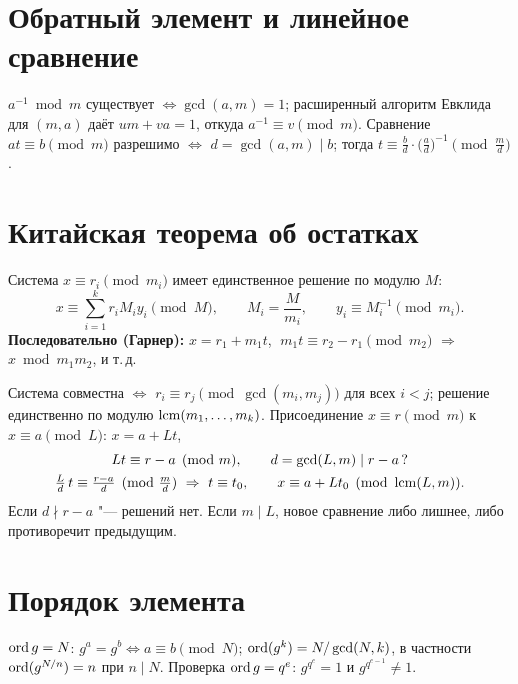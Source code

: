 \documentclass{ca-handout}
\begin{document}
\makehandouttitle

\section{Обратный элемент и линейное сравнение}
$a^{-1} \bmod m$ существует $\iff \gcd(a, m) = 1$; расширенный алгоритм Евклида для $(m, a)$
даёт $um + va = 1$, откуда $a^{-1} \equiv v \pmod m$.
Сравнение $at \equiv b \pmod m$ разрешимо $\iff$ $d = \gcd(a, m) \mid b$; тогда
$t \equiv \frac bd \cdot \bigl(\frac ad\bigr)^{-1} \pmod{\frac md}$.

\section{Китайская теорема об остатках}
\begin{reminder}[title={Попарно взаимно простые модули $m_1, \dots, m_k$, $M = m_1 \cdots m_k$}]
Система $x \equiv r_i \pmod{m_i}$ имеет единственное решение по модулю $M$:
\[
  x \equiv \sum_{i=1}^k r_i M_i y_i \pmod M, \qquad M_i = \frac{M}{m_i}, \qquad
  y_i \equiv M_i^{-1} \pmod{m_i}.
\]
\textbf{Последовательно (Гарнер):} $x = r_1 + m_1 t$, $\;m_1 t \equiv r_2 - r_1 \pmod{m_2}$
$\Rightarrow$ $x \bmod m_1 m_2$, и т.\,д.
\end{reminder}

\begin{reminder}[title={Произвольные модули}]
Система совместна $\iff$ $r_i \equiv r_j \pmod{\gcd(m_i, m_j)}$ для всех $i < j$; решение
единственно по модулю $\operatorname{lcm}(m_1, \dots, m_k)$.
Присоединение $x \equiv r \pmod m$ к $x \equiv a \pmod{L}$: $x = a + Lt$,
\[
\begin{gathered}
  Lt \equiv r - a \pmod m, \qquad d = \gcd(L, m) \mid r - a\,?\\
  \tfrac Ld\, t \equiv \tfrac{r - a}{d} \pmod{\tfrac md} \ \Rightarrow\ t \equiv t_0, \qquad
  x \equiv a + L t_0 \pmod{\lcm(L, m)}.
\end{gathered}
\]
Если $d \nmid r - a$ "--- решений нет. Если $m \mid L$, новое сравнение либо лишнее, либо
противоречит предыдущим.
\end{reminder}

\section{Порядок элемента}
$\operatorname{ord} g = N$: $g^a = g^b \iff a \equiv b \pmod N$; $\operatorname{ord}(g^k) = N/\gcd(N, k)$,
в частности $\operatorname{ord}(g^{N/n}) = n$ при $n \mid N$. Проверка $\operatorname{ord} g = q^e$: $g^{q^e} = 1$ и
$g^{q^{e-1}} \ne 1$.
\end{document}
